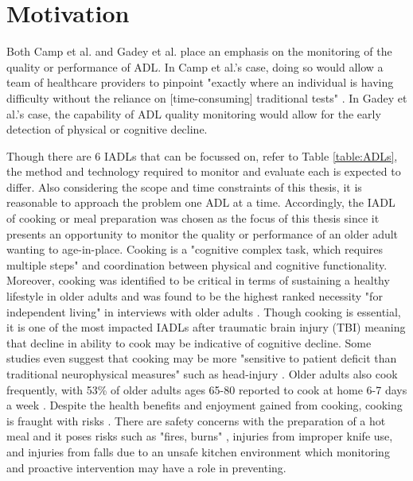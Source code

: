 \clearpage
\section{Motivation}
Both Camp et al. and Gadey et al. place an emphasis on the monitoring of the quality or performance of ADL. In Camp et al.'s case, doing so would allow a team of healthcare providers to pinpoint "exactly where an individual is having difficulty without the reliance on [time-consuming] traditional tests" \cite{camp_technology_2021}. In Gadey et al.'s case, the capability of ADL quality monitoring would allow for the early detection of physical or cognitive decline.

Though there are 6 IADLs that can be focussed on, refer to Table \ref{table:ADLs}, the method and technology required to monitor and evaluate each is expected to differ. Also considering the scope and time constraints of this thesis, it is reasonable to approach the problem one ADL at a time. Accordingly, the IADL of cooking or meal preparation was chosen as the focus of this thesis since it presents an opportunity to monitor the quality or performance of an older adult wanting to age-in-place. Cooking is a "cognitive complex task, which requires multiple steps" \cite{sikkes_qualitative_2014} and coordination between physical and cognitive functionality. Moreover, cooking was identified to be critical in terms of sustaining a healthy lifestyle in older adults \cite{bouchard_smart_2020} and was found to be the highest ranked necessity "for independent living" in interviews with older adults \cite{dubuc_perceived_2019}. Though cooking is essential, it is one of the most impacted IADLs after traumatic brain injury (TBI) meaning that decline in ability to cook may be indicative of cognitive decline. Some studies even suggest that cooking may be more "sensitive to patient deficit than traditional neurophysical measures" such as head-injury \cite{dohertyCookingTaskMaking2015}. Older adults also cook frequently, with 53\% of older adults ages 65-80 reported to cook at home 6-7 days a week \cite{malani_joy_2020}. Despite the health benefits and enjoyment gained from cooking, cooking is fraught with risks \cite{yared_cooking_2015}. There are safety concerns with the preparation of a hot meal and it poses risks such as "fires, burns" \cite{dubuc_perceived_2019}, injuries from improper knife use, and injuries from falls due to an unsafe kitchen environment \cite{yared_cooking_2015} which monitoring and proactive intervention may have a role in preventing. 

